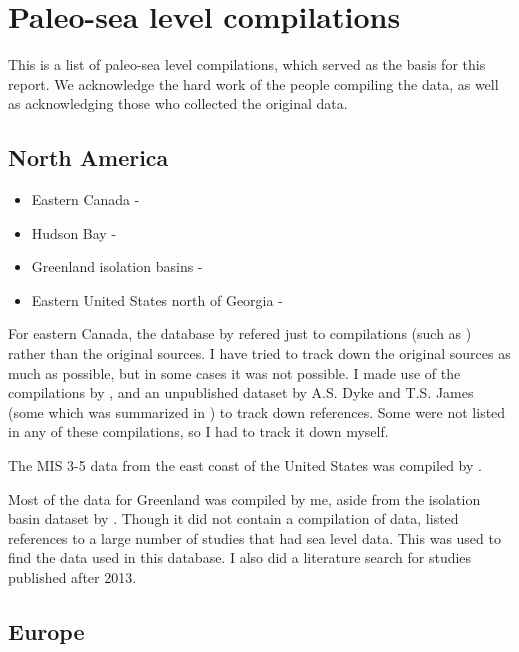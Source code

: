 \section{Paleo-sea level compilations}

This is a list of paleo-sea level compilations, which served as the basis for this report. We acknowledge the hard work of the people compiling the data, as well as acknowledging those who collected the original data.

\subsection{North America}

\begin{itemize}
  \item Eastern Canada - \citet{VacchiEtal2018}
  \item Hudson Bay - \citet{SimonEtal2016}
  \item Greenland isolation basins - \citet{LongEtal2008}
  \item Eastern United States north of Georgia - \citet{EngelhartHorton2012}
\end{itemize}

For eastern Canada, the database by \citet{VacchiEtal2018} refered just to compilations (such as \citet{SimonEtal2016}) rather than the original sources. I have tried to track down the original sources as much as possible, but in some cases it was not possible. I made use of the compilations by \citet{SimonEtal2016},  \citet{GowanEtal2016} and an unpublished dataset by A.S. Dyke and T.S. James (some which was summarized in \citet{DykePeltier2000}) to track down references. Some were not listed in any of these compilations, so I had to track it down myself.

The MIS 3-5 data from the east coast of the United States was compiled by \citet{PicoEtal2017}.

Most of the data for Greenland was compiled by me, aside from the isolation basin dataset by \citet{LongEtal2008}. Though it did not contain a compilation of data, \citet{LecavalierEtal2014} listed references to a large number of studies that had sea level data. This was used to find the data used in this database. I also did a literature search for studies published after 2013.

\subsection{Europe}

